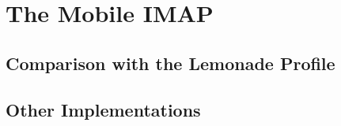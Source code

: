 \documentclass[trojita]{subfiles}
\begin{document}
\chapter{The Mobile IMAP}
\label{sec:mobile-imap}

\section{Comparison with the Lemonade Profile}
\label{sec:lemonade-comparison}

\section{Other Implementations}
\end{document}
